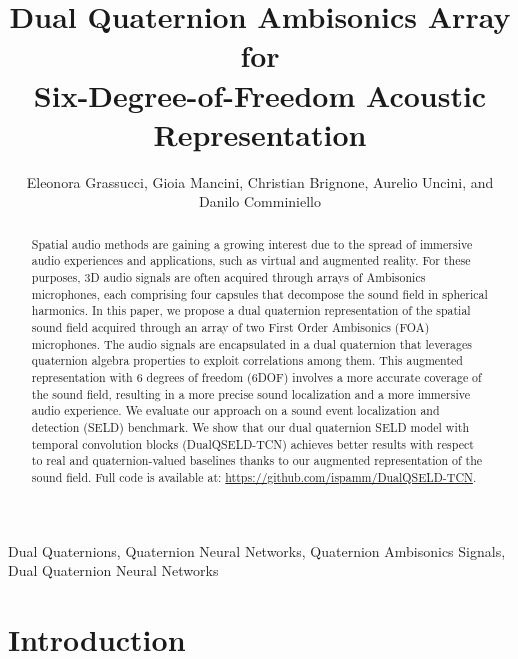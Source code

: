 \documentclass[3p, preprint, twocolumn]{elsarticle}
\begin{document}
\begin{frontmatter}

\title{Dual Quaternion Ambisonics Array for \\Six-Degree-of-Freedom Acoustic Representation}

\author{Eleonora Grassucci, Gioia Mancini, Christian Brignone, Aurelio Uncini, and Danilo Comminiello}
\address{Dept. of Information Engineering, Electronics and Telecommunications (DIET), Sapienza University of Rome, Italy.}


\begin{abstract}
Spatial audio methods are gaining a growing interest due to the spread of immersive audio experiences and applications, such as virtual and augmented reality. For these purposes, 3D audio signals are often acquired through arrays of Ambisonics microphones, each comprising four capsules that decompose the sound field in spherical harmonics. In this paper, we propose a dual quaternion representation of the spatial sound field acquired through an array of two First Order Ambisonics (FOA) microphones. The audio signals are encapsulated in a dual quaternion that leverages quaternion algebra properties to exploit correlations among them. This augmented representation with 6 degrees of freedom (6DOF) involves a more accurate coverage of the sound field, resulting in a more precise sound localization and a more immersive audio experience. We evaluate our approach on a sound event localization and detection (SELD) benchmark. We show that our dual quaternion SELD model with temporal convolution blocks (DualQSELD-TCN) achieves better results with respect to real and quaternion-valued baselines thanks to our augmented representation of the sound field. Full code is available at: \url{https://github.com/ispamm/DualQSELD-TCN}.
\end{abstract}

\begin{keyword}
Dual Quaternions, Quaternion Neural Networks, Quaternion Ambisonics Signals, Dual Quaternion Neural Networks
\end{keyword}

\end{frontmatter}



\section{Introduction}
\label{sec:intro}
\end{document}
